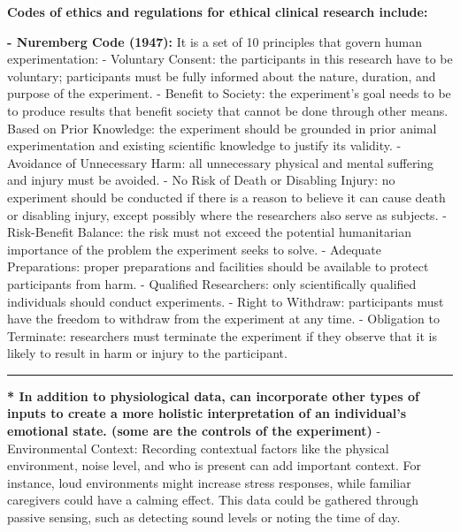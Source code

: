 \documentclass[12pt, research paper]{report}
\begin{document}
	\noindent \textbf{Codes of ethics and regulations for ethical clinical research include:}
	\linebreak 
	
	\noindent \textbf{- Nuremberg Code (1947):}
	It is a set of 10 principles that govern human experimentation:
	\newline - Voluntary Consent: the participants in this research have to be voluntary; participants must be fully informed about the nature, duration, and purpose of the experiment.
	\newline - Benefit to Society: the experiment’s goal needs to be to produce results that benefit society that cannot be done through other means.
	Based on Prior Knowledge: the experiment should be grounded in prior animal experimentation and existing scientific knowledge to justify its validity.
	\newline - Avoidance of Unnecessary Harm: all unnecessary physical and mental suffering and injury must be avoided.
	\newline - No Risk of Death or Disabling Injury: no experiment should be conducted if there is a reason to believe it can cause death or disabling injury, except possibly where the researchers also serve as subjects.
	\newline - Risk-Benefit Balance: the risk must not exceed the potential humanitarian importance of the problem the experiment seeks to solve. 
	\newline - Adequate Preparations: proper preparations and facilities should be available to protect participants from harm.
	\newline - Qualified Researchers: only scientifically qualified individuals should conduct experiments.
	\newline - Right to Withdraw: participants must have the freedom to withdraw from the experiment at any time. 
	\newline - Obligation to Terminate: researchers must terminate the experiment if they observe that it is likely to result in harm or injury to the participant. 
	\noindent \rule{13.85cm}{0.01cm}
	\textbf{* In addition to physiological data, can incorporate other types of inputs to create a more holistic interpretation of an individual’s emotional state. (some are the controls of the experiment)}
	\newline - Environmental Context: Recording contextual factors like the physical environment, noise level, and who is present can add important context. For instance, loud environments might increase stress responses, while familiar caregivers could have a calming effect. This data could be gathered through passive sensing, such as detecting sound levels or noting the time of day.
\end{document}
